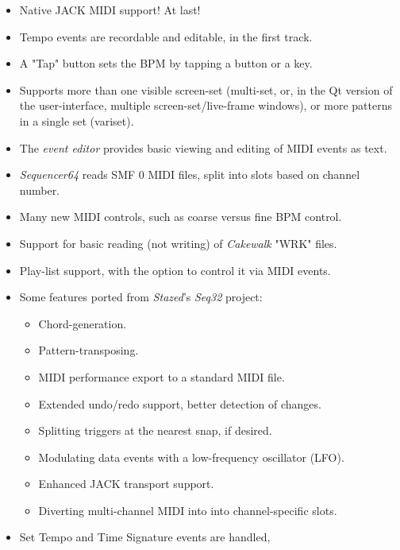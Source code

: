 \documentclass[
 11pt,
 twoside,
 a4paper,
 headinclude,
 footinclude,
 final                                 %
]{article}
\begin{document}
   \begin{itemize}
      \item Native JACK MIDI support!  At last!
      \item Tempo events are recordable and editable, in the first track.
      \item A "Tap" button sets the BPM by tapping a button or a key.
      \item Supports more than one visible screen-set (multi-set, or, in the Qt
         version of the user-interface, multiple screen-set/live-frame windows),
         or more patterns in a single set (variset).
      \item The \textsl{event editor}
         provides basic viewing and editing of MIDI events as text.
      \item \textsl{Sequencer64} reads SMF 0 MIDI files, split
         into slots based on channel number.
      \item Many new MIDI controls, such as coarse versus fine BPM control.
      \item Support for basic reading (not writing) of
         \textsl{Cakewalk} "WRK" files.
      \item Play-list support, with the option to control it via MIDI events.
      \item Some features ported from \textsl{Stazed}'s
         \textsl{Seq32} \cite{seq32} project:
         \begin{itemize}
            \item Chord-generation.
            \item Pattern-transposing.
            \item MIDI performance export to a standard MIDI file.
            \item Extended undo/redo support, better detection of changes.
            \item Splitting triggers at the nearest snap, if desired.
            \item Modulating data events with a low-frequency oscillator (LFO).
            \item Enhanced JACK transport support.
            \item Diverting multi-channel MIDI into into channel-specific slots.
         \end{itemize}
      \item Set Tempo and Time Signature events are handled,

\end{itemize}
\end{document}
